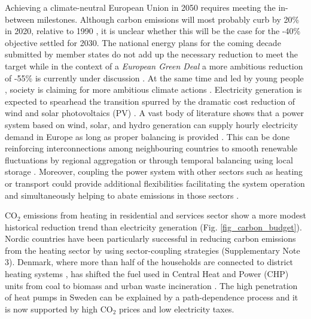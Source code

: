 \documentclass[5p]{elsarticle} %
\begin{document}
Achieving a climate-neutral European Union in 2050 \cite{in-depth_2018} requires meeting the in-between milestones. Although carbon emissions will most probably curb by 20\% in 2020, relative to 1990 \cite{EEA_totalGHG}, it is unclear whether this will be the case for the -40\% objective settled for 2030. The national energy plans for the coming decade submitted by member states do not add up the necessary reduction to meet the target \cite{EU-appraisal_2019} while in the context of a \textit{European Green Deal} a more ambitious reduction of -55\% is currently under discussion \cite{GreenDeal}. At the same time and led by young people \cite{Warren_2019}, society is claiming for more ambitious climate actions \cite{Rinscheid_2019}. Electricity generation is expected to spearhead the transition spurred by the dramatic cost reduction of wind \cite{Lantz_2012} and solar photovoltaics (PV) \cite{Creutzig_2017, Haegel_2019}. A vast body of literature shows that a power system based on wind, solar, and hydro generation can supply hourly electricity demand in Europe as long as proper balancing is provided 
\cite{Eriksen_2017, Schlachtberger_2017, Gils_2017a, Brown_response}. This can be done reinforcing interconnections among neighbouring countries \cite{Rodriguez_2014} to smooth renewable fluctuations by regional aggregation or through temporal balancing using local storage \cite{Rasmussen_2012, Cebulla_2017}. Moreover, coupling the power system with other sectors such as heating or transport could provide additional flexibilities facilitating the system operation and simultaneously helping to abate emissions in those sectors \cite{Connolly_2016, Brown_2018, Child_2019}. 

CO$_2$ emissions from heating in residential and services sector show a more modest historical reduction trend than electricity generation (Fig. \ref{fig_carbon_budget}). Nordic countries have been particularly successful in reducing carbon emissions from the heating sector by using sector-coupling strategies (Supplementary Note 3). Denmark, where more than half of the households are connected to district heating systems \cite{Gross_2019}, has shifted the fuel used in Central Heat and Power (CHP) units from coal to biomass and urban waste incineration \cite{DEA_2015}. The high penetration of heat pumps in Sweden can be explained by a path-dependence process \cite{Gross_2019} and it is now supported by high CO$_2$ prices \cite{Carbon_pricing_2019} and low electricity taxes. 
\end{document}
